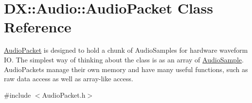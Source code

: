 \hypertarget{class_d_x_1_1_audio_1_1_audio_packet}{\section{D\-X\-:\-:Audio\-:\-:Audio\-Packet Class Reference}
\label{class_d_x_1_1_audio_1_1_audio_packet}
}


\hyperlink{class_d_x_1_1_audio_1_1_audio_packet}{Audio\-Packet} is designed to hold a chunk of Audio\-Samples for hardware waveform I\-O. The simplest way of thinking about the class is as an array of \hyperlink{class_d_x_1_1_audio_1_1_audio_sample}{Audio\-Sample}. Audio\-Packets manage their own memory and have many useful functions, such as raw data access as well as array-\/like access.  




{\ttfamily \#include $<$Audio\-Packet.\-h$>$}

